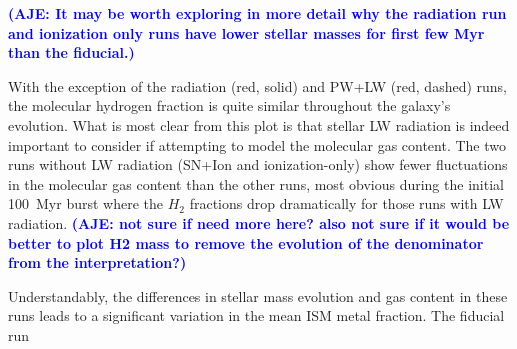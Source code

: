 \documentclass[twocolumn]{aastex62}
\newcommand{\radstyle}{red, solid}
\newcommand{\pelwstyle}{red, dashed}
\newcommand{\aje}[1]{\textcolor{blue}{\textbf{(AJE: #1)}}}
\begin{document}
\aje{It may be worth exploring in more detail why the radiation run and ionization only runs have lower stellar masses for first few Myr than the fiducial.}

With the exception of the radiation (\radstyle) and PW+LW (\pelwstyle) runs, the molecular hydrogen fraction is quite similar throughout the galaxy's evolution. What is most clear from this plot is that stellar LW radiation is indeed important to consider if attempting to model the molecular gas content. The two runs without LW radiation (SN+Ion and ionization-only) show fewer fluctuations in the molecular gas content than the other runs, most obvious during the initial 100~Myr burst where the $H_2$ fractions drop dramatically for those runs with LW radiation. \aje{not sure if need more here? also not sure if it would be better to plot H2 mass to remove the evolution of the denominator from the interpretation?}

Understandably, the differences in stellar mass evolution and gas content in these runs leads to a significant variation in the mean ISM metal fraction. The fiducial run 
\end{document}
